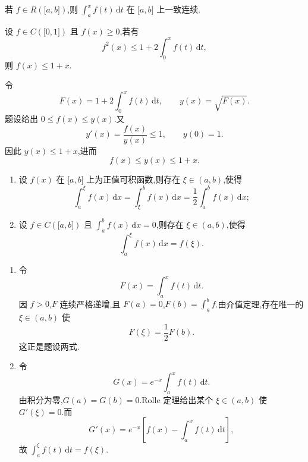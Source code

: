\begin{theorem}[\markstar]
    若 $f\in R(\lbrack a,b\rbrack)$,则 $\displaystyle\int_a^x f(t)\,\mathrm{d}t$ 在 $\lbrack a,b\rbrack$ 上一致连续.
\end{theorem}

\begin{example}
    设 $f\in C(\lbrack 0,1\rbrack)$ 且 $f(x)\geq0$,若有
    \[
        f^2(x)\leq1+2\int_0^x f(t)\,\mathrm{d}t,
    \]
    则 $f(x)\leq1+x$.
\end{example}
\exampleblank

\begin{solution}
    令
    \[
        F(x)=1+2\int_0^x f(t)\,\mathrm{d}t,
        \qquad
        y(x)=\sqrt{F(x)}.
    \]
    题设给出 $0\leq f(x)\leq y(x)$.又
    \[
        y'(x)=\dfrac{f(x)}{y(x)}\leq1,
        \qquad y(0)=1.
    \]
    因此 $y(x)\leq1+x$,进而
    \[
        f(x)\leq y(x)\leq1+x.
    \]
\end{solution}

\begin{example}
    \begin{enumerate}
        \item 设 $f(x)$ 在 $\lbrack a,b\rbrack$ 上为正值可积函数,则存在 $\xi\in(a,b)$,使得
              \[
                  \displaystyle\int_a^\xi f(x)\,\mathrm{d}x
                  =\int_\xi^b f(x)\,\mathrm{d}x
                  =\dfrac{1}{2}\int_a^b f(x)\,\mathrm{d}x;
              \]
        \item 设 $f\in C(\lbrack a,b\rbrack)$ 且 $\displaystyle\int_a^b f(x)\,\mathrm{d}x=0$,则存在 $\xi\in(a,b)$,使得
              \[
                  \displaystyle\int_a^\xi f(x)\,\mathrm{d}x=f(\xi).
              \]
    \end{enumerate}
\end{example}
\exampleblank

\begin{solution}
    \leavevmode
    \begin{enumerate}
        \item 令
              \[
                  F(x)=\int_a^xf(t)\,\mathrm{d}t.
              \]
              因 $f>0$,$F$ 连续严格递增,且 $F(a)=0$,$F(b)=\displaystyle\int_a^bf$.由介值定理,存在唯一的 $\xi\in(a,b)$ 使
              \[
                  F(\xi)=\dfrac{1}{2}F(b).
              \]
              这正是题设两式.

        \item 令
              \[
                  G(x)=e^{-x}\int_a^xf(t)\,\mathrm{d}t.
              \]
              由积分为零,$G(a)=G(b)=0$.Rolle 定理给出某个 $\xi\in(a,b)$ 使 $G'(\xi)=0$.而
              \[
                  G'(x)=e^{-x}\left[f(x)-\int_a^xf(t)\,\mathrm{d}t\right],
              \]
              故 $\displaystyle\int_a^\xi f(t)\,\mathrm{d}t=f(\xi)$.
    \end{enumerate}
\end{solution}

